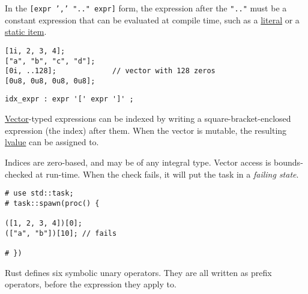 \documentclass[]{article}
\begin{document}
In the \texttt{{[}expr ',' ".." expr{]}} form, the expression after the
\texttt{".."} must be a constant expression that can be evaluated at
compile time, such as a \hyperref[literals]{literal} or a
\hyperref[static-items]{static item}.

\begin{verbatim}
[1i, 2, 3, 4];
["a", "b", "c", "d"];
[0i, ..128];             // vector with 128 zeros
[0u8, 0u8, 0u8, 0u8];
\end{verbatim}


\begin{verbatim}
idx_expr : expr '[' expr ']' ;
\end{verbatim}

\hyperref[vector-types]{Vector}-typed expressions can be indexed by
writing a square-bracket-enclosed expression (the index) after them.
When the vector is mutable, the resulting
\hyperref[lvaluesux2c-rvalues-and-temporaries]{lvalue} can be assigned
to.

Indices are zero-based, and may be of any integral type. Vector access
is bounds-checked at run-time. When the check fails, it will put the
task in a \emph{failing state}.

\begin{verbatim}
# use std::task;
# task::spawn(proc() {

([1, 2, 3, 4])[0];
(["a", "b"])[10]; // fails

# })
\end{verbatim}


Rust defines six symbolic unary operators. They are all written as
prefix operators, before the expression they apply to.
\end{document}
